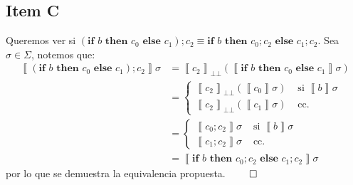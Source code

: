 \documentclass{article}
\newcommand{\sem}[1]{\left\llbracket #1\right\rrbracket}
\newcommand{\bbot}{\bot\!\!\!\bot}
\newcommand{\cif}[3]{\textbf{if }#1\textbf{ then }#2\textbf{ else }#3}
\begin{document}
\subsection*{Item C}
Queremos ver si $(\cif{b}{c_0}{c_1});c_2 \equiv \cif{b}{c_0;c_2}{c_1;c_2}$.
Sea $\sigma \in \Sigma$, notemos que:
\begin{equation*}
  \begin{aligned}
    \sem{(\cif{b}{c_0}{c_1});c_2}\sigma &= \sem{c_2}_{\bbot}(\sem{\cif{b}{c_0}{c_1}}\sigma) \\ 
                                        &= \begin{cases}
                                          \sem{c_2}_{\bbot}(\sem{c_0}\sigma) &\text{ si }\sem{b}\sigma \\ 
                                          \sem{c_2}_{\bbot}(\sem{c_1}\sigma) &\text{ cc. }
                                        \end{cases} \\ 
                                        &= \begin{cases}
                                          \sem{c_0; c_2}\sigma & \text{ si }\sem{b}\sigma \\ 
                                          \sem{c_1; c_2}\sigma & \text{ cc. }
                                        \end{cases} \\ 
                                        &= \sem{\cif{b}{c_0; c_2}{c_1; c_2}}\sigma
  \end{aligned}
\end{equation*}
por lo que se demuestra la equivalencia propuesta. $\qed$
\end{document}
